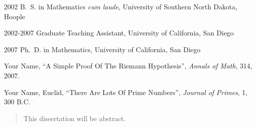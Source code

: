 \begin{frontmatter}
%
%



%
%
\begin{vitapage}
\begin{vita}
  \item[2002] B.~S. in Mathematics \emph{cum laude}, University of Southern North Dakota, Hoople
  \item[2002-2007] Graduate Teaching Assistant, University of California, San Diego
  \item[2007] Ph.~D. in Mathematics, University of California, San Diego
\end{vita}
\begin{publications}
  \item Your Name, ``A Simple Proof Of The Riemann Hypothesis'', \emph{Annals of Math}, 314, 2007.
  \item Your Name, Euclid, ``There Are Lots Of Prime Numbers'', \emph{Journal of Primes}, 1, 300 B.C.
\end{publications}
\end{vitapage}


%
%
\begin{abstract}
  This dissertation will be abstract.
\end{abstract}


\end{frontmatter}
